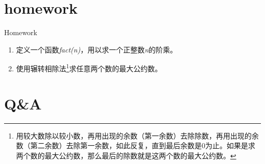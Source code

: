 \documentclass{beamer}
\begin{document}
\section{homework}
\begin{frame}{Homework}
\begin{enumerate}
\item
定义一个函数\textit{fact(n)}，用以求一个正整数\textit{n}的阶乘。
\item
使用辗转相除法\footnote{用较大数除以较小数，再用出现的余数（第一余数）去除除数，再用出现的余数（第二余数）去除第一余数，如此反复，直到最后余数是0为止。如果是求两个数的最大公约数，那么最后的除数就是这两个数的最大公约数。}求任意两个数的最大公约数。
\end{enumerate}
\end{frame}
\section{Q\&A}
\begin{frame}
\end{frame}


%
\end{document}
